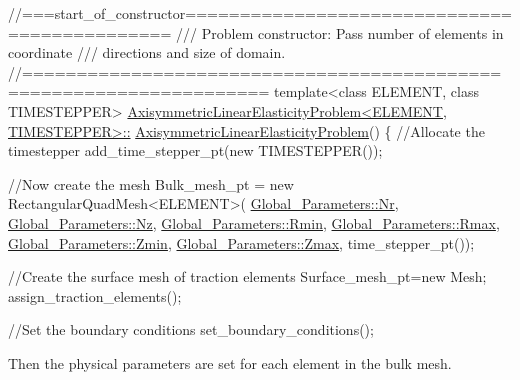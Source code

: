 \begin{DoxyCodeInclude}
\textcolor{comment}{//===start\_of\_constructor=============================================}
\textcolor{comment}{/// Problem constructor: Pass number of elements in coordinate}
\textcolor{comment}{}\textcolor{comment}{/// directions and size of domain.}
\textcolor{comment}{}\textcolor{comment}{//====================================================================}
\textcolor{keyword}{template}<\textcolor{keyword}{class} ELEMENT, \textcolor{keyword}{class} TIMESTEPPER>
\hyperlink{classAxisymmetricLinearElasticityProblem_aaa4da18227b8b20dfba1f67bad4907ed}{AxisymmetricLinearElasticityProblem<ELEMENT, TIMESTEPPER>::}
\hyperlink{classAxisymmetricLinearElasticityProblem_aaa4da18227b8b20dfba1f67bad4907ed}{AxisymmetricLinearElasticityProblem}()
\{
 \textcolor{comment}{//Allocate the timestepper}
 add\_time\_stepper\_pt(\textcolor{keyword}{new} TIMESTEPPER());

 \textcolor{comment}{//Now create the mesh}
 Bulk\_mesh\_pt = \textcolor{keyword}{new} RectangularQuadMesh<ELEMENT>(
   \hyperlink{namespaceGlobal__Parameters_aeebb1e39d849d32cebdc9be13026606e}{Global\_Parameters::Nr},
   \hyperlink{namespaceGlobal__Parameters_a1f35a0690c7745167a7178fb71f92e6e}{Global\_Parameters::Nz},
   \hyperlink{namespaceGlobal__Parameters_ab0e73c8b2e1105b14203856b81efa8cf}{Global\_Parameters::Rmin},
   \hyperlink{namespaceGlobal__Parameters_a06f5ea713550f61da323eafb91fceedd}{Global\_Parameters::Rmax},
   \hyperlink{namespaceGlobal__Parameters_a1813b913bc85d4ce15ea68226ba6c63f}{Global\_Parameters::Zmin},
   \hyperlink{namespaceGlobal__Parameters_a36b7b169826f906d1d8d1a3aa4347d80}{Global\_Parameters::Zmax},
   time\_stepper\_pt());

 \textcolor{comment}{//Create the surface mesh of traction elements}
 Surface\_mesh\_pt=\textcolor{keyword}{new} Mesh;
 assign\_traction\_elements();
 
 \textcolor{comment}{//Set the boundary conditions}
 set\_boundary\_conditions();

\end{DoxyCodeInclude}


Then the physical parameters are set for each element in the bulk mesh.


